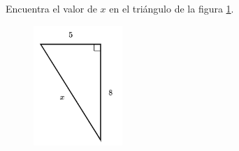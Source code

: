 \question[15]  Encuentra el valor de $x$ en el triángulo de la figura \ref{fig:lados_pitagoras_16}.
\begin{figure}[H]
    \begin{center}
        \includegraphics[width=0.3\textwidth]{../images/lados_pitagoras_16.png}
    \end{center}
    \caption{}
    \label{fig:lados_pitagoras_16}
\end{figure}